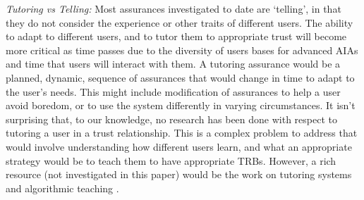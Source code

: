 \emph{Tutoring vs Telling:}
Most assurances investigated to date are `telling', in that they do not consider the experience or other traits of different users. The ability to adapt to different users, and to tutor them to appropriate trust will become more critical as time passes due to the diversity of users bases for advanced AIAs and time that users will interact with them. A tutoring assurance would be a planned, dynamic, sequence of assurances that would change in time to adapt to the user's needs. This might include modification of assurances to help a user avoid boredom, or to use the system differently in varying circumstances. It isn't surprising that, to our knowledge, no research has been done with respect to tutoring a user in a trust relationship. This is a complex problem to address that would involve understanding how different users learn, and what an appropriate strategy would be to teach them to have appropriate TRBs. However, a rich resource (not investigated in this paper) would be the work on tutoring systems \citet{Wenger2014-ld} and algorithmic teaching \citet{Balbach2009-jw}.
